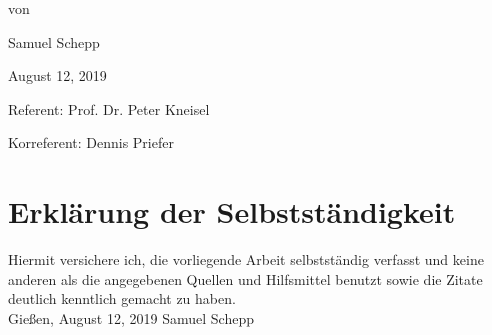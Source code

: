 \begin{titlepage}
\begin{center}
von
\par\end{center}

\begin{center}
Samuel Schepp
\par\end{center}

\begin{center}
August 12, 2019
\par\end{center}

\vspace{1.5cm}

Referent: Prof. Dr. Peter Kneisel 

Korreferent: Dennis Priefer

\end{titlepage}

\thispagestyle{empty}
\chapter*{Erklärung der Selbstständigkeit}
\thispagestyle{empty}
Hiermit versichere ich, die vorliegende Arbeit selbstständig verfasst und keine anderen als die angegebenen Quellen und Hilfsmittel benutzt sowie die Zitate deutlich kenntlich gemacht zu haben.
\vspace{4\baselineskip}\\
Gießen, August 12, 2019 \hfill Samuel Schepp
\vspace{4\baselineskip}\\
\clearpage
\mbox{}\thispagestyle{empty}

